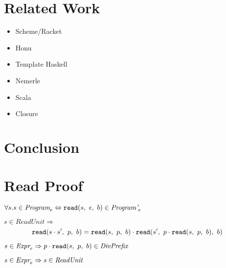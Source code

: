 \documentclass[preprint,10pt]{sigplanconf}
\begin{document}
\section{Related Work}
\label{sec-7}

\begin{itemize}
\item Scheme/Racket
\item Honu
\item Template Haskell
\item Nemerle
\item Scala
\item Closure
\end{itemize}
\section{Conclusion}
\label{sec-8}

\appendix

\clearpage

\section{Read Proof}

\begin{theorem}\mbox{}

  \( \forall s. s \in \textit{Program}_{e} \Leftrightarrow 
  \texttt{read}(s,~\epsilon,~b) \in \textit{Program'}_{e} \)

\end{theorem}

\begin{lemma}\mbox{}

  \( s \in \textit{ReadUnit} \Rightarrow \)
\[
  \texttt{read}(s\cdot s',~p,~b) = 
  \texttt{read}(s,~p,~b) \cdot \texttt{read}(s',~p \cdot \texttt{read}(s,~p,~b),~b)
\] 
\end{lemma}

\begin{lemma}\mbox{}

  \( s \in \textit{Expr}_{e} \Rightarrow p \cdot \texttt{read}(s,~p,~b) \in \textit{DivPrefix} \)
\end{lemma}

\begin{lemma}
  \( s \in \textit{Expr}_{e} \Rightarrow s \in \textit{ReadUnit} \)
\end{lemma}
\end{document}

